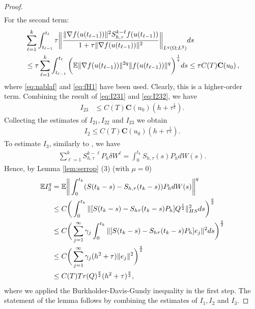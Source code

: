 \documentclass[reqno, 11pt]{amsart}
\theoremstyle{plain}
\theoremstyle{definition}
\theoremstyle{remark}
\numberwithin{equation}{section}
\numberwithin{theorem}{section}
\newcommand{\con}{\mathbf{C}}
\begin{document}
{\begin{proof}
\begin{align}
\end{align}
For the  second term:  
\begin{align} \label{eq:I232}
&\sum\limits_{\ell=1}^k\int_{t_{\ell-1}}^{t_\ell}  \tau \bigg\|\frac{\|\nabla f(u(t_{\ell-1}))\|^2 S_{h,\tau}^{k-\ell}f(u(t_{\ell-1}))}{1+\tau\|\nabla f(u(t_{\ell-1}))\|^2}\bigg\|_{L^q(\Omega;L^2)}ds\notag\\
&\leq \tau \sum\limits_{\ell=1}^k\int_{t_{\ell-1}}^{t_\ell} \bigg(\mathbb{E}\|\nabla f(u(t_{\ell-1})) \|^{2q}\|f(u(t_{\ell-1}))\|^q\bigg)^{\frac{1}{q}}ds \leq \tau C(T) \con(u_0) \, ,
\end{align}
where \eqref{eq:nablaf} and  \eqref{eq:fH1} have been used. Clearly, this is a higher-order term.  
Combining the result of \eqref{eq:I231} and \eqref{eq:I232}, we have
\begin{align}
I_{23}&\leq C(T) \con(u_0)(h+\tau^{\frac{1}{2}}).
\end{align}
Collecting the estimates of $I_{21}, I_{22}$ and $I_{23}$ we obtain
\begin{align}
I_2\leq C(T) \con(u_0)(h+\tau^{\frac{1}{2}}).
\end{align}
  To estimate $I_3$, similarly to \cite[Theorem 3.14]{Kruse},   we have
\begin{align}
\sum\limits_{\ell=1}^k S_{h,\tau}^{k-\ell}P_h\delta W^\ell=\int_0^{t_k} S_{h,\tau}(s)P_hdW(s). 
\end{align}
Hence, by Lemma \ref{lem:serrop} (3) (with $\mu=0$)
\begin{align}
\mathbb{E}I_3^q&=\mathbb{E}\bigg\|\int_0^{t_k}(S(t_k-s)-S_{h,\tau}(t_k-s))P_hdW(s)\bigg\|^q\notag\\
&\leq C\bigg(\int_0^{t_k} \|[S(t_k-s)-S_{h\tau}(t_k-s)P_h]Q^{\frac{1}{2}}\|_{HS}^2ds\bigg)^\frac{q}{2}\notag\\
&\leq C\bigg(\sum\limits_{j=1}^\infty \gamma_j\int_0^{t_k} \|[S(t_k-s)-S_{h\tau}(t_k-s)P_h]e_j\|^2ds\bigg)^\frac{q}{2}\notag\\
&\leq C \bigg(\sum\limits_{j=1}^\infty \gamma_j (h^2+\tau)\|e_j\|^2\bigg)^\frac{q}{2}\notag\\
&\leq C(T) Tr(Q)^{\frac{q}{2}}(h^2+\tau)^{\frac{q}{2}},
\end{align}
where we applied the Burkholder-Davis-Gundy inequality in the first step.
The statement of the lemma follows by combining the estimates of $I_1, I_2$ and $I_3$. 
\end{proof}


}
\end{document}
